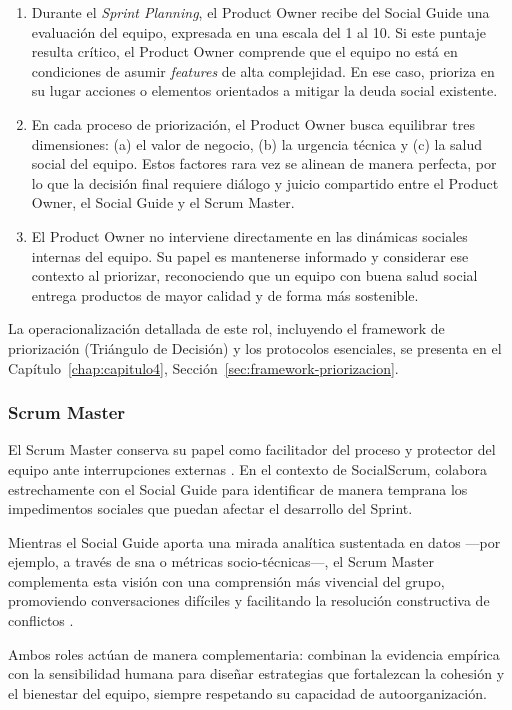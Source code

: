 \begin{enumerate}
    \item Durante el \textit{Sprint Planning}, el Product Owner recibe del Social Guide una evaluación del equipo, expresada en una escala del 1 al 10. Si este puntaje resulta crítico, el Product Owner comprende que el equipo no está en condiciones de asumir \textit{features} de alta complejidad. En ese caso, prioriza en su lugar acciones o elementos orientados a mitigar la deuda social existente.
    \item En cada proceso de priorización, el Product Owner busca equilibrar tres dimensiones: (a) el valor de negocio, (b) la urgencia técnica y (c) la salud social del equipo. Estos factores rara vez se alinean de manera perfecta, por lo que la decisión final requiere diálogo y juicio compartido entre el Product Owner, el Social Guide y el Scrum Master.
    \item El Product Owner no interviene directamente en las dinámicas sociales internas del equipo. Su papel es mantenerse informado y considerar ese contexto al priorizar, reconociendo que un equipo con buena salud social entrega productos de mayor calidad y de forma más sostenible.
\end{enumerate}

La operacionalización detallada de este rol, incluyendo el framework de priorización (Triángulo de Decisión) y los protocolos esenciales, se presenta en el Capítulo~\ref{chap:capitulo4}, Sección~\ref{sec:framework-priorizacion}.

\subsubsection{Scrum Master}

El Scrum Master conserva su papel como facilitador del proceso y protector del equipo ante interrupciones externas \cite{schwaber2020scrum}. En el contexto de SocialScrum, colabora estrechamente con el Social Guide para identificar de manera temprana los impedimentos sociales que puedan afectar el desarrollo del Sprint.

Mientras el Social Guide aporta una mirada analítica sustentada en datos —por ejemplo, a través de \gls{sna} o métricas socio-técnicas—, el Scrum Master complementa esta visión con una comprensión más vivencial del grupo, promoviendo conversaciones difíciles y facilitando la resolución constructiva de conflictos \cite{saeeda2024nontechnicaldebt}.

Ambos roles actúan de manera complementaria: combinan la evidencia empírica con la sensibilidad humana para diseñar estrategias que fortalezcan la cohesión y el bienestar del equipo, siempre respetando su capacidad de autoorganización.


